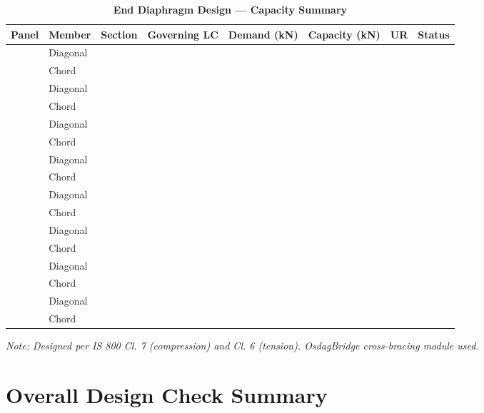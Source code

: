 \documentclass[12pt,a4paper]{report}
\numberwithin{table}{chapter}
\numberwithin{figure}{chapter}
\begin{document}
\vspace{1em}

\begin{longtable}{|C{2.0cm}|L{1.8cm}|C{2.2cm}|C{3.0cm}|C{1.8cm}|C{1.8cm}|C{1.2cm}|C{1.8cm}|}
\caption{\textbf{End Diaphragm Design --- Capacity Summary}}
\hline
\textbf{Panel} & \textbf{Member} & \textbf{Section} & \textbf{Governing LC} & \textbf{Demand (kN)} & \textbf{Capacity (kN)} & \textbf{UR} & \textbf{Status} \\[6pt]
\hline
{} & Diagonal &  &  &  &  &  &  \\[6pt]
 & Chord &  &  &  &  &  &  \\[6pt]
\hline
{} & Diagonal &  &  &  &  &  &  \\[6pt]
 & Chord &  &  &  &  &  &  \\[6pt]
\hline
{} & Diagonal &  &  &  &  &  &  \\[6pt]
 & Chord &  &  &  &  &  &  \\[6pt]
\hline
{} & Diagonal &  &  &  &  &  &  \\[6pt]
 & Chord &  &  &  &  &  &  \\[6pt]
\hline
{} & Diagonal &  &  &  &  &  &  \\[6pt]
 & Chord &  &  &  &  &  &  \\[6pt]
\hline
{} & Diagonal &  &  &  &  &  &  \\[6pt]
 & Chord &  &  &  &  &  &  \\[6pt]
\hline
{} & Diagonal &  &  &  &  &  &  \\[6pt]
 & Chord &  &  &  &  &  &  \\[6pt]
\hline
{} & Diagonal &  &  &  &  &  &  \\[6pt]
 & Chord &  &  &  &  &  &  \\[6pt]
\hline
\end{longtable}
\noindent\textit{Note: Designed per IS 800 Cl. 7 (compression) and Cl. 6 (tension). OsdagBridge cross-bracing module used.}

\section{Overall Design Check Summary}
\label{sec:overall-summary}
\end{document}
